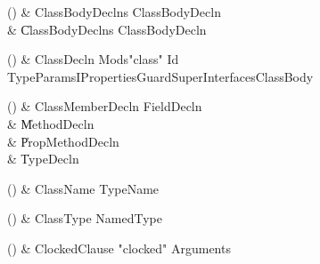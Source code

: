 \begin{bbgrammarappendix}

() & ClassBodyDeclns \label{prod:ClassBodyDeclns}  \: ClassBodyDecln  \\

 &    \| ClassBodyDeclns ClassBodyDecln \\

\end{bbgrammarappendix}

\begin{bbgrammarappendix}

() & ClassDecln \label{prod:ClassDecln}  \: Mods\opt \xcd"class" Id TypeParamsI\opt Properties\opt Guard\opt Super\opt Interfaces\opt ClassBody  \\


\end{bbgrammarappendix}

\begin{bbgrammarappendix}

() & ClassMemberDecln \label{prod:ClassMemberDecln}  \: FieldDecln  \\

 &    \| MethodDecln \\
 &    \| PropMethodDecln \\
 &    \| TypeDecln \\

\end{bbgrammarappendix}

\begin{bbgrammarappendix}

() & ClassName \label{prod:ClassName}  \: TypeName  \\


\end{bbgrammarappendix}

\begin{bbgrammarappendix}

() & ClassType \label{prod:ClassType}  \: NamedType  \\


\end{bbgrammarappendix}

\begin{bbgrammarappendix}

() & ClockedClause \label{prod:ClockedClause}  \: \xcd"clocked" Arguments  \\


\end{bbgrammarappendix}

